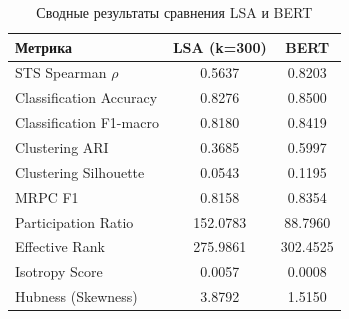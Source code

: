 \begin{table}[htbp]
  \centering
  \caption{Сводные результаты сравнения LSA и BERT}
  \label{tab:results}
  \begin{tabular}{lcc}
    \toprule
    Метрика & LSA (k=300) & BERT \\
    \midrule
    STS Spearman \( \rho \) & 0.5637 & 0.8203 \\
    Classification Accuracy & 0.8276 & 0.8500 \\
    Classification F1-macro & 0.8180 & 0.8419 \\
    Clustering ARI & 0.3685 & 0.5997 \\
    Clustering Silhouette & 0.0543 & 0.1195 \\
    MRPC F1 & 0.8158 & 0.8354 \\
    Participation Ratio & 152.0783 & 88.7960 \\
    Effective Rank & 275.9861 & 302.4525 \\
    Isotropy Score & 0.0057 & 0.0008 \\
    Hubness (Skewness) & 3.8792 & 1.5150 \\
    \bottomrule
  \end{tabular}
\end{table}
